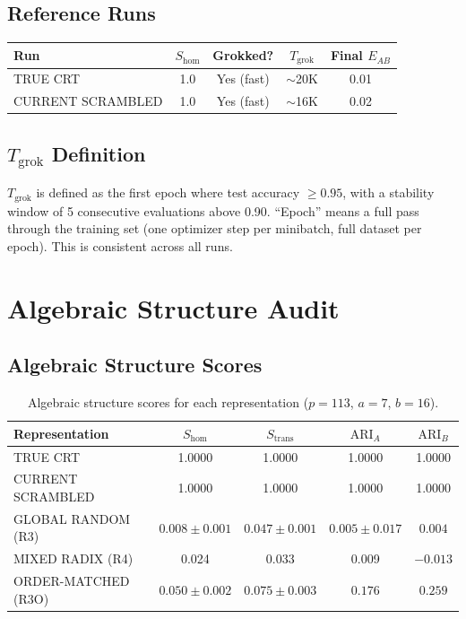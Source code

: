 \documentclass[11pt,a4paper]{article}
\newcommand{\Shom}{S_{\mathrm{hom}}}
\newcommand{\Strans}{S_{\mathrm{trans}}}
\newcommand{\ARI}{\mathrm{ARI}}
\newcommand{\EAB}{E_{AB}}
\begin{document}
\subsection{Reference Runs}

\begin{table}[h]
\centering
\begin{tabular}{lcccc}
\toprule
Run & $\Shom$ & Grokked? & $T_{\mathrm{grok}}$ & Final $\EAB$ \\
\midrule
TRUE CRT & 1.0 & Yes (fast) & $\sim$20K & 0.01 \\
CURRENT SCRAMBLED & 1.0 & Yes (fast) & $\sim$16K & 0.02 \\
\bottomrule
\end{tabular}
\end{table}

\subsection{$T_{\mathrm{grok}}$ Definition}

$T_{\mathrm{grok}}$ is defined as the first epoch where test accuracy $\geq 0.95$, with a stability window of 5 consecutive evaluations above 0.90. ``Epoch'' means a full pass through the training set (one optimizer step per minibatch, full dataset per epoch). This is consistent across all runs.

\section{Algebraic Structure Audit}

\subsection{Algebraic Structure Scores}

\begin{table}[h]
\centering
\caption{Algebraic structure scores for each representation ($p = 113$, $a = 7$, $b = 16$).}
\label{tab:structure}
\begin{tabular}{lcccc}
\toprule
Representation & $\Shom$ & $\Strans$ & $\ARI_A$ & $\ARI_B$ \\
\midrule
TRUE CRT & 1.0000 & 1.0000 & 1.0000 & 1.0000 \\
CURRENT SCRAMBLED & 1.0000 & 1.0000 & 1.0000 & 1.0000 \\
GLOBAL RANDOM (R3) & $0.008 \pm 0.001$ & $0.047 \pm 0.001$ & $0.005 \pm 0.017$ & $0.004$ \\
MIXED RADIX (R4) & 0.024 & 0.033 & 0.009 & $-0.013$ \\
ORDER-MATCHED (R3O) & $0.050 \pm 0.002$ & $0.075 \pm 0.003$ & $0.176$ & $0.259$ \\
\bottomrule
\end{tabular}
\end{table}
\end{document}
